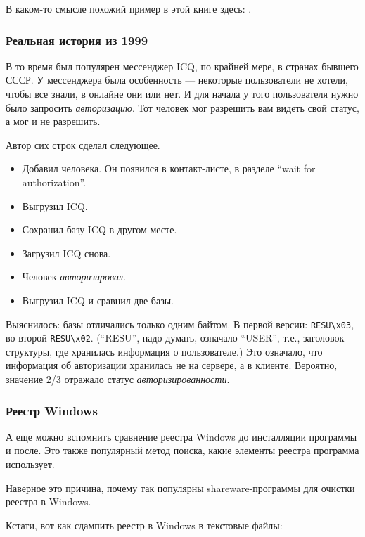 В каком-то смысле похожий пример в этой книге здесь: .


\subsubsection{Реальная история из 1999}

В то время был популярен мессенджер ICQ, по крайней мере, в странах бывшего СССР.
У мессенджера была особенность --- некоторые пользователи не хотели, чтобы все знали, в онлайне они или нет.
И для начала у того пользователя нужно было запросить \emph{авторизацию}.
Тот человек мог разрешить вам видеть свой статус, а мог и не разрешить.

Автор сих строк сделал следующее.

\begin{itemize}
\item Добавил человека. Он появился в контакт-листе, в разделе ``wait for authorization''.
\item Выгрузил ICQ.
\item Сохранил базу ICQ в другом месте.
\item Загрузил ICQ снова.
\item Человек \emph{авторизировал}.
\item Выгрузил ICQ и сравнил две базы.
\end{itemize}

Выяснилось: базы отличались только одним байтом.
В первой версии: \verb|RESU\x03|, во второй \verb|RESU\x02|.
(``RESU'', надо думать, означало ``USER'', т.е., заголовок структуры, где хранилась информация о пользователе.)
Это означало, что информация об авторизации хранилась не на сервере, а в клиенте.
Вероятно, значение 2/3 отражало статус \emph{авторизированности}.

\subsubsection{Реестр Windows}

А еще можно вспомнить сравнение реестра Windows до инсталляции программы и после.
Это также популярный метод поиска, какие элементы реестра программа использует.

Наверное это причина, почему так популярны shareware-программы для очистки реестра в Windows.

Кстати, вот как сдампить реестр в Windows в текстовые файлы:

